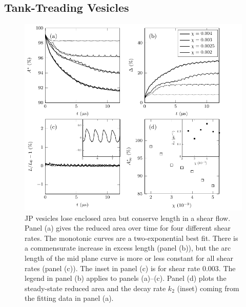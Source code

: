 \documentclass[lineno]{jfm}
\begin{document}
\subsection{Tank-Treading Vesicles}
\begin{figure}
\begin{center}
\includegraphics[width=13.5cm]{Figure4_Wrapper.pdf}
\end{center} 
  \caption{\label{figure4} JP vesicles lose enclosed area but conserve
  length in a shear flow. Panel (a) gives the reduced area over time for
  four different shear rates. The monotonic curves are a two-exponential
  best fit. There is a commensurate increase in excess length (panel
  (b)), but the arc length of the mid plane curve is more or less
  constant for all shear rates (panel (c)). The inset in panel (c) is
  for shear rate 0.003. The legend in panel (b) applies to panels
  (a)--(c). Panel (d) plots the steady-state reduced area and the decay
  rate $k_2$ (inset) coming from the fitting data in panel (a).}
\end{figure}

\end{document}
